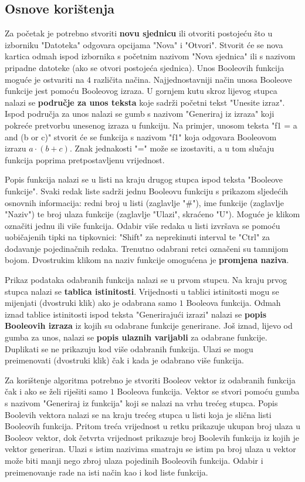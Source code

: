 \documentclass[times, utf8, diplomski]{fer}
\begin{document}
\subsection{Osnove korištenja} \label{subsec:osnove_koristenja}

Za početak je potrebno stvoriti \textbf{novu sjednicu} ili otvoriti postojeću što u izborniku "Datoteka" odgovara opcijama "Nova" i "Otvori". Stvorit će se nova kartica odmah ispod izbornika s početnim nazivom "Nova sjednica" ili s nazivom pripadne datoteke (ako se otvori postojeća sjednica). Unos Booleovih funkcija moguće je ostvariti na $4$ različita načina. Najjednostavniji način unosa Booleove funkcije jest pomoću Booleovog izraza. U gornjem kutu skroz lijevog stupca nalazi se \textbf{područje za unos teksta} koje sadrži početni tekst "Unesite izraz". Ispod područja za unos nalazi se gumb s nazivom "Generiraj iz izraza" koji pokreće pretvorbu unesenog izraza u funkciju. Na primjer, unosom teksta "f1 = a and (b or c)" stvorit će se funkcija s nazivom "f1" koja odgovara Booleovom izrazu $a \cdot (b + c)$. Znak jednakosti "=" može se izostaviti, a u tom slučaju funkcija poprima pretpostavljenu vrijednost.

Popis funkcija nalazi se u listi na kraju drugog stupca ispod teksta "Booleove funkcije". Svaki redak liste sadrži jednu Booleovu funkciju s prikazom sljedećih osnovnih informacija: redni broj u listi (zaglavlje "\#"), ime funkcije (zaglavlje "Naziv") te broj ulaza funkcije (zaglavlje "Ulazi", skraćeno "U"). Moguće je klikom označiti jednu ili više funkcija. Odabir više redaka u listi izvršava se pomoću uobičajenih tipki na tipkovnici: "Shift" za neprekinuti interval te "Ctrl" za dodavanje pojedinačnih redaka. Trenutno odabrani retci označeni su tamnijom bojom. Dvostrukim klikom na naziv funkcije omogućena je \textbf{promjena naziva}.

Prikaz podataka odabranih funkcija nalazi se u prvom stupcu. Na kraju prvog stupca nalazi se \textbf{tablica istinitosti}. Vrijednosti u tablici istinitosti mogu se mijenjati (dvostruki klik) ako je odabrana samo $1$ Booleova funkcija. Odmah iznad tablice istinitosti ispod teksta "Generirajući izrazi" nalazi se \textbf{popis Booleovih izraza} iz kojih su odabrane funkcije generirane. Još iznad, lijevo od gumba za unos, nalazi se \textbf{popis ulaznih varijabli} za odabrane funkcije. Duplikati se ne prikazuju kod više odabranih funkcija. Ulazi se mogu preimenovati (dvostruki klik) čak i kada je odabrano više funkcija.

Za korištenje algoritma potrebno je stvoriti Booleov vektor iz odabranih funkcija čak i ako se želi riješiti samo $1$ Booleova funkcija. Vektor se stvori pomoću gumba s nazivom "Generiraj iz funkcija" koji se nalazi na vrhu trećeg stupca. Popis Boolevih vektora nalazi se na kraju trećeg stupca u listi koja je slična listi Booleovih funkcija. Pritom treća vrijednost u retku prikazuje ukupan broj ulaza u Booleov vektor, dok četvrta vrijednost prikazuje broj Boolevih funkcija iz kojih je vektor generiran. Ulazi s istim nazivima smatraju se istim pa broj ulaza u vektor može biti manji nego zbroj ulaza pojedinih Booleovih funkcija. Odabir i preimenovanje rade na isti način kao i kod liste funkcija.
\end{document}
